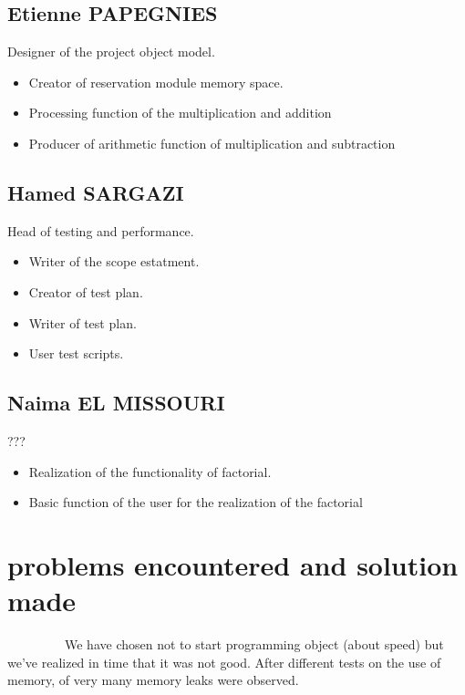 \documentclass[11pt]{report}
\begin{document}
    \section{Etienne PAPEGNIES}

  Designer of the project object model.
        \begin{itemize}
           \item Creator of reservation module memory space.
            \item Processing function of the multiplication and addition
            \item Producer of arithmetic function of multiplication and subtraction
        \end{itemize}

   \section{Hamed SARGAZI}

 Head of testing and performance.
        \begin{itemize}
            \item Writer of the scope estatment.
            \item Creator of test plan.
	    \item Writer of test plan.
            \item User test scripts.
        \end{itemize}

 \section{Naima EL MISSOURI}
 ???
        \begin{itemize}
            \item Realization of the functionality of factorial.
	    \item Basic function of the user for the realization of the factorial
        \end{itemize}

 \chapter*{problems encountered and solution made }  
~~~~~~~~~We have chosen not to start programming object (about speed) but we've realized in time that it was not good.
After different tests on the use of memory, of very many memory leaks were observed.
\end{document}
